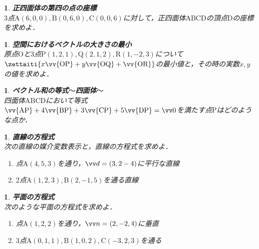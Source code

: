 \documentclass[10pt,
fleqn,
dvipdfmx,
uplatex
]{jsarticle}
\newtheorem{question}[Question]{}
\begin{document}
\begin{question}{\bf\boldmath 正四面体の第四の点の座標}\\
$3$点$\text{A}\left(6,0,0\right),\text{B}\left(0,6,0\right),\text{C}\left(0,0,6\right)$に対して，正四面体$\text{ABCD}$の頂点$\text{D}$の座標を求めよ．
\end{question}



\begin{question}{\bf\boldmath 空間におけるベクトルの大きさの最小}\\
原点$\text{O}$と$3$点$\text{P}\left(1,2,1\right),\text{Q}\left(2,1,2\right),\text{R}\left(1,-2,3\right)$について$\zettaiti{x\vv {\text{OP}}+y\vv {\text{OQ}}+\vv {\text{OR}}}$の最小値と，その時の実数$x,y$の値を求めよ．
\end{question}



\begin{question}{\bf\boldmath ベクトル和の等式$〜$四面体$〜$}\\
四面体$\text{ABCD}$において等式
$\vv {\text{AP}}+4\vv {\text{BP}}+3\vv {\text{CP}}+5\vv {\text{DP}}=\vv 0$を満たす点$\text{P}$はどのような点か．
\end{question}



\begin{question}{\bf\boldmath 直線の方程式}\\
次の直線の媒介変数表示と，直線の方程式を求めよ．
\begin{enumerate}
\item 点$\text{A}\left(4,5,3\right)$を通り，$\vv d=\left(3,2-4\right)$に平行な直線
\item $2$点$\text{A}\left(1,2,3\right),\text{B}\left(2,-1,5\right)$を通る直線
\end{enumerate}

\end{question}



\begin{question}{\bf\boldmath 平面の方程式}\\
次のような平面の方程式を求めよ．
\begin{enumerate}
\item 点$\text{A}\left(1,2,2\right)$を通り，$\vv n=\left(2,-2,4\right)$に垂直
\item $3$点$\text{A}\left(0,1,1\right),\text{B}\left(1,0,2\right),\text{C}\left(-3,2,3\right)$を通る
\end{enumerate}

\end{question}
\end{document}
